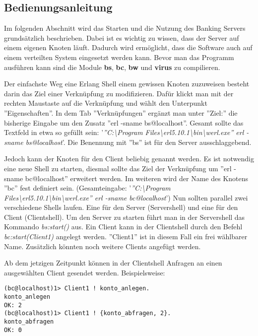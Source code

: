 \subsection{Bedienungsanleitung}

Im folgenden Abschnitt wird das Starten und die Nutzung des Banking Servers grundsätzlich beschrieben. Dabei ist es wichtig zu wissen, dass der Server auf einem eigenen Knoten läuft. Dadurch wird ermöglicht, dass die Software auch auf einem verteilten System eingesetzt werden kann. Bevor man das Programm ausführen kann sind die Module \textbf{bs}, \textbf{bc}, \textbf{bw} und \textbf{virus} zu compilieren.

Der einfachste Weg eine Erlang Shell einem gewissen Knoten zuzuweisen besteht darin das Ziel einer Verknüpfung zu modifizieren. Dafür klickt man mit der rechten Maustaste auf die Verknüpfung und wählt den Unterpunkt ''Eigenschaften''.  In dem Tab ''Verknüpfungen'' ergänzt man unter ''Ziel:'' die bisherige Eingabe um den Zusatz ''erl -sname bs@localhost''. Gesamt sollte das Textfeld in etwa so gefüllt sein: '\textit{''C:\textbackslash Program Files\textbackslash erl5.10.1\textbackslash bin\textbackslash werl.exe'' erl -sname bs@localhost}'. Die Benennung mit ''bs'' ist für den Server ausschlaggebend.

Jedoch kann der Knoten für den Client beliebig genannt werden. Es ist notwendig eine neue Shell zu starten, diesmal sollte das Ziel der Verknüpfung um ''erl -sname bc@localhost'' erweitert werden. Im weiteren wird der Name des Knotens ''bc'' fest definiert sein. (Gesamteingabe: '\textit{''C:\textbackslash Program Files\textbackslash erl5.10.1\textbackslash bin\textbackslash werl.exe'' erl -sname bc@localhost}') Nun sollten parallel zwei verschiedene Shells laufen. Eine für den Server (Servershell) und eine für den Client (Clientshell). Um den Server zu starten führt man in der Servershell das Kommando \textit{bs:start()} aus. Ein Client kann in der Clientshell durch den Befehl \textit{bc:start(Client1)} angelegt werden. ''Client1'' ist in diesem Fall ein frei wählbarer Name. Zusätzlich könnten noch weitere Clients angefügt werden.

Ab dem jetzigen Zeitpunkt können in der Clientshell Anfragen an einen ausgewählten Client gesendet werden. Beispielsweise:

\begin{lstlisting} 
(bc@localhost)1> Client1 ! konto_anlegen.
konto_anlegen
OK: 2
(bc@localhost)1> Client1 ! {konto_abfragen, 2}.
konto_abfragen
OK: 0
\end{lstlisting}